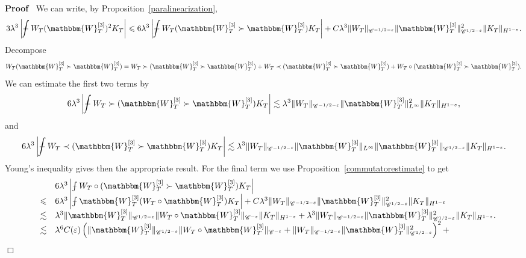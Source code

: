 \documentclass[11pt, oneside]{article}   	%
\newenvironment{proof}{\noindent\textbf{Proof\ }}{\hspace*{\fill}$\Box$\medskip}
\def\Xint#1{\mathchoice
{\XXint\displaystyle\textstyle{#1}}%
{\XXint\textstyle\scriptstyle{#1}}%
{\XXint\scriptstyle\scriptscriptstyle{#1}}%
{\XXint\scriptscriptstyle\scriptscriptstyle{#1}}%
\!\int}
\def\XXint#1#2#3{{\setbox0=\hbox{$#1{#2#3}{\int}$ }
\vcenter{\hbox{$#2#3$ }}\kern-.6\wd0}}
\def\dashint{\Xint-}
\newcommand{\bint}{\dashint}
\newcommand{\VV}{\mathscr{C}}
\begin{document}
\begin{proof}
  We can write, by Proposition~\ref{paralinearization},
  \[ 3 \lambda^3 \left| \bint W_T (\mathbbm{W}_T^{[3]})^2 K_T \right|
     \leqslant 6 \lambda^3 \left| \bint W_T (\mathbbm{W}_T^{[3]} \succ
     \mathbbm{W}_T^{[3]}) K_T \right| + C \lambda^3 \| W_T \|_{\VV^{- 1 / 2
     - \varepsilon}} \| \mathbbm{W}_T^{[3]} \|^2_{\VV^{1 / 2 - \varepsilon}}
     \| K_T \|_{H^{1 - \varepsilon}} . \]
  Decompose
  \[ W_T (\mathbbm{W}_T^{[3]} \succ \mathbbm{W}_T^{[3]}) = W_T \succ
     (\mathbbm{W}_T^{[3]} \succ \mathbbm{W}_T^{[3]}) + W_T \prec
     (\mathbbm{W}_T^{[3]} \succ \mathbbm{W}_T^{[3]}) + W_T \circ
     (\mathbbm{W}_T^{[3]} \succ \mathbbm{W}_T^{[3]}) . \]
  We can estimate the first two terms by
  \[ 6 \lambda^3 \left| \bint W_T \succ (\mathbbm{W}_T^{[3]} \succ
     \mathbbm{W}_T^{[3]}) K_T \right| \lesssim \lambda^3 \| W_T \|_{\VV^{-
     1 / 2 - \varepsilon}} \| \mathbbm{W}_T^{[3]} \|^2_{L^{\infty}} \| K_T
     \|_{H^{1 - \varepsilon}}, \]
  and
  \[ 6 \lambda^3 \left| \bint W_T \prec (\mathbbm{W}_T^{[3]} \succ
     \mathbbm{W}_T^{[3]}) K_T \right| \lesssim \lambda^3 \| W_T \|_{\VV^{-
     1 / 2 - \varepsilon}} \| \mathbbm{W}_T^{[3]} \|_{L^{\infty}} \|
     \mathbbm{W}_T^{[3]} \|_{\VV^{1 / 2 - \varepsilon}} \| K_T \|_{H^{1 -
     \varepsilon}} . \]
  Young's inequality gives then the appropriate result. For the final term we
  use Proposition~\ref{commutatorestimate} to get
  \[ \begin{array}{lll}
       &  & 6 \lambda^3 \left| \bint W_T \circ (\mathbbm{W}_T^{[3]} \succ
       \mathbbm{W}_T^{[3]}) K_T \right|\\
       & \leqslant & 6 \lambda^3 \left| \bint \mathbbm{W}_T^{[3]} (W_T \circ
       \mathbbm{W}_T^{[3]}) K_T \right| + C \lambda^3 \| W_T \|_{\VV^{- 1 /
       2 - \varepsilon}} \| \mathbbm{W}_T^{[3]} \|^2_{\VV^{1 / 2 -
       \varepsilon}} \| K_T \|_{H^{1 - \varepsilon}}\\
       & \lesssim & \lambda^3 \| \mathbbm{W}_T^{[3]} \|_{\VV^{1 / 2 -
       \varepsilon}} \| W_T \circ \mathbbm{W}_T^{[3]} \|_{\VV^{- \varepsilon}}
       \| K_T \|_{H^{1 - \varepsilon}} + \lambda^3 \| W_T \|_{\VV^{- 1 / 2 -
       \varepsilon}} \| \mathbbm{W}_T^{[3]} \|^2_{\VV^{1 / 2 - \varepsilon}}
       \| K_T \|_{H^{1 - \varepsilon}} .\\
       & \lesssim & \lambda^6 C (\varepsilon) \left( \| \mathbbm{W}_T^{[3]}
       \|_{\VV^{1 / 2 - \varepsilon}} \| W_T \circ \mathbbm{W}_T^{[3]}
       \|_{\VV^{- \varepsilon}} + \| W_T \|_{\VV^{- 1 / 2 - \varepsilon}} \|
       \mathbbm{W}_T^{[3]} \|^2_{\VV^{1 / 2 - \varepsilon}} \right)^2 +

\end{array}\]
\end{proof}
\end{document}
